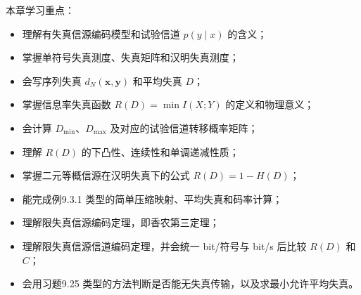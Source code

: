 本章学习重点：
\begin{itemize}
  \item 理解有失真信源编码模型和试验信道 $p(y\mid x)$ 的含义；
  \item 掌握单符号失真测度、失真矩阵和汉明失真测度；
  \item 会写序列失真 $d_N(\mathbf x,\mathbf y)$ 和平均失真 $D$；
  \item 掌握信息率失真函数 $R(D)=\min I(X;Y)$ 的定义和物理意义；
  \item 会计算 $D_{\min}$、$D_{\max}$ 及对应的试验信道转移概率矩阵；
  \item 理解 $R(D)$ 的下凸性、连续性和单调递减性质；
  \item 掌握二元等概信源在汉明失真下的公式 $R(D)=1-H(D)$；
  \item 能完成例9.3.1 类型的简单压缩映射、平均失真和码率计算；
  \item 理解限失真信源编码定理，即香农第三定理；
  \item 理解限失真信源信道编码定理，并会统一 bit/符号与 bit/s 后比较 $R(D)$ 和 $C$；
  \item 会用习题9.25 类型的方法判断是否能无失真传输，以及求最小允许平均失真。
\end{itemize}
